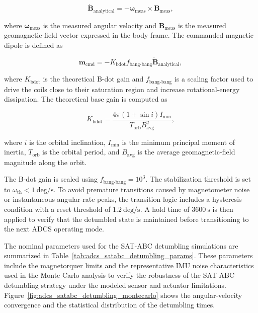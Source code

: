 \begin{equation}
    \dot{\mathbf{B}}_{\mathrm{analytical}}
    =
    -
    \boldsymbol{\omega}_{\mathrm{meas}}
    \times
    \mathbf{B}_{\mathrm{meas}},
    \label{eq:adcs_satabc_bdot_analytical}
\end{equation}

where \(\boldsymbol{\omega}_{\mathrm{meas}}\) is the measured angular velocity and \(\mathbf{B}_{\mathrm{meas}}\) is the measured geomagnetic-field vector expressed in the body frame. The commanded magnetic dipole is defined as

\begin{equation}
    \mathbf{m}_{\mathrm{cmd}}
    =
    -
    K_{\mathrm{bdot}}
    f_{\mathrm{bang\mbox{-}bang}}
    \dot{\mathbf{B}}_{\mathrm{analytical}},
    \label{eq:adcs_satabc_bdot_dipole_command}
\end{equation}

where \(K_{\mathrm{bdot}}\) is the theoretical B-dot gain and \(f_{\mathrm{bang\mbox{-}bang}}\) is a scaling factor used to drive the coils close to their saturation region and increase rotational-energy dissipation. The theoretical base gain is computed as

\begin{equation}
    K_{\mathrm{bdot}}
    =
    \frac{
        4\pi
        \left(
            1 + \sin i
        \right)
        I_{\min}
    }{
        T_{\mathrm{orb}}
        B_{\mathrm{avg}}^{2}
    },
    \label{eq:adcs_satabc_bdot_gain}
\end{equation}

where \(i\) is the orbital inclination, \(I_{\min}\) is the minimum principal moment of inertia, \(T_{\mathrm{orb}}\) is the orbital period, and \(B_{\mathrm{avg}}\) is the average geomagnetic-field magnitude along the orbit.

The B-dot gain is scaled using \(f_{\mathrm{bang\mbox{-}bang}} = 10^{3}\). The stabilization threshold is set to \(\omega_{\mathrm{th}} < 1~\mathrm{deg/s}\). To avoid premature transitions caused by magnetometer noise or instantaneous angular-rate peaks, the transition logic includes a hysteresis condition with a reset threshold of \(1.2~\mathrm{deg/s}\). A hold time of \(3600~\mathrm{s}\) is then applied to verify that the detumbled state is maintained before transitioning to the next ADCS operating mode.

The nominal parameters used for the SAT-ABC detumbling simulations are summarized in Table~\ref{tab:adcs_satabc_detumbling_params}. These parameters include the magnetorquer limits and the representative IMU noise characteristics used in the Monte Carlo analysis to verify the robustness of the SAT-ABC detumbling strategy under the modeled sensor and actuator limitations. Figure~\ref{fig:adcs_satabc_detumbling_montecarlo} shows the angular-velocity convergence and the statistical distribution of the detumbling times. 

